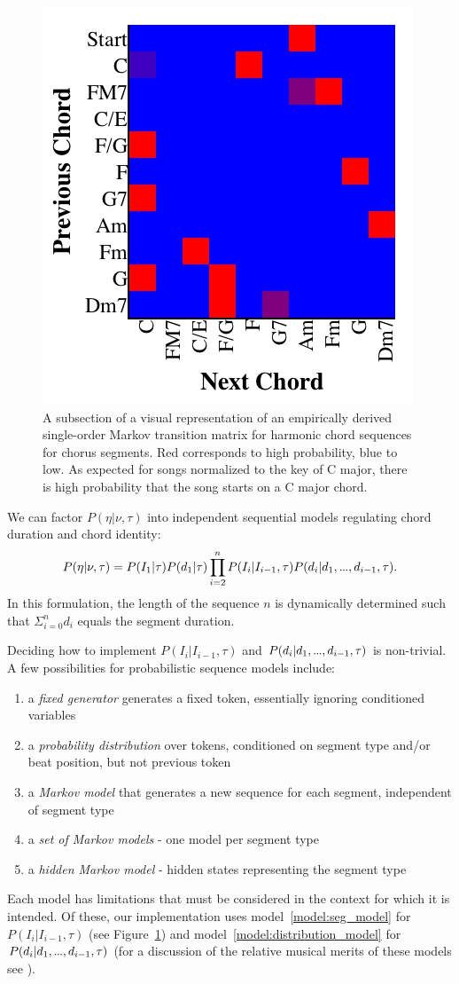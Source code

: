 \documentclass[phd,electronic,oneside,twosidetoc,letterpaper,chaptercenter,parttop,lol,lof,lot]{byumsphd}
\newcommand\mydots{\hbox to .75em{.\hss.\hss.}}
\begin{document}
\begin{figure}
	\centering
	\includegraphics[width=.6\linewidth]{harmony}
	\caption{\label{fig:harmony} A subsection of a visual representation of an empirically derived single-order Markov transition matrix for harmonic chord sequences for chorus segments. Red corresponds to high probability, blue to low. As expected for songs normalized to the key of C major, there is high probability that the song starts on a C major chord. }
\end{figure}

We can factor $P(\eta|\nu,\tau)$ into independent sequential models regulating chord duration and chord identity:
\small
\[ P(\eta|\nu,\tau) = P(I_1|\tau) P(d_1|\tau) \prod_{i=2}^n P(I_i|I_{i-1},\tau) P(d_i | d_1,\mydots,d_{i-1},\tau). \]
\normalsize
\noindent  In this formulation, the length of the sequence $n$ is dynamically determined such that $\Sigma_{i=0}^n d_i$ equals the segment duration.

Deciding how to implement $P(I_i|I_{i-1},\tau)$ and $P(d_i | d_1,\mydots,d_{i-1},\tau)$ is non-trivial. A few possibilities for probabilistic sequence models include:
\begin{enumerate}
\item a \textit{fixed generator} generates a fixed token, essentially ignoring conditioned variables
\item \label{model:distribution_model}a \textit{probability distribution} over tokens, conditioned on segment type and/or beat position, but not previous token
\item a \textit{Markov model} that generates a new sequence for each segment, independent of segment type
\item \label{model:seg_model}a \textit{set of Markov models} - one model per segment type
\item a \textit{hidden Markov model} - hidden states representing the segment type
\end{enumerate}
\noindent Each model has limitations that must be considered in the context for which it is intended. Of these, our implementation uses model~\ref{model:seg_model} for $P(I_i|I_{i-1},\tau)$ (see Figure~\ref{fig:harmony}) and model~\ref{model:distribution_model} for $P(d_i | d_1,\mydots,d_{i-1},\tau)$ (for a discussion of the relative musical merits of these models see \citeauthor{bodily2017Mume} \cite{bodily2017Mume}).
\end{document}
